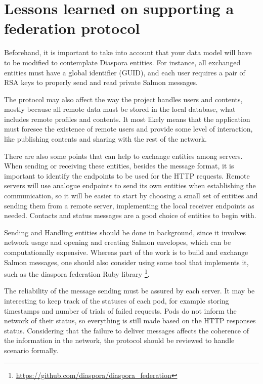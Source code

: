 \section{Lessons learned on supporting a federation protocol}

Beforehand, it is important to take into account that your data model will have
to be modified to contemplate Diaspora entities. For instance, all exchanged
entities must have a global identifier (GUID), and each user requires a pair of
RSA keys to properly send and read private Salmon messages.

The protocol may also affect the way the project handles users and contents,
mostly because all remote data must be stored in the local database, what
includes remote profiles and contents. It most likely means that the
application must foresee the existence of remote users and provide some level
of interaction, like publishing contents and sharing with the rest of the
network.

There are also some points that can help to exchange entities among servers.
When sending or receiving these entities, besides the message format, it is
important to identify the endpoints to be used for the HTTP requests. Remote
servers will use analogue endpoints to send its own entities when establishing
the communication, so it will be easier to start by choosing a small set of
entities and sending them from a remote server, implementing the local receiver
endpoints as needed. Contacts and status messages are a good choice of entities
to begin with.

Sending and Handling entities should be done in background, since it
involves network usage and opening and creating Salmon envelopes, which
can be computationally expensive. Whereas part of the work is to build
and exchange Salmon messages, one should also consider using some tool
that implements it, such as the diaspora federation Ruby library
\footnote{\url{https://github.com/diaspora/diaspora_federation}}.

The reliability of the message sending must be assured by each server. It may
be interesting to keep track of the statuses of each pod, for example storing
timestamps and number of trials of failed requests. Pods do not inform the
network of their status, so everything is still made based on the HTTP
responses status. Considering that the failure to deliver messages affects the
coherence of the information in the network, the protocol should be reviewed to
handle scenario formally.

